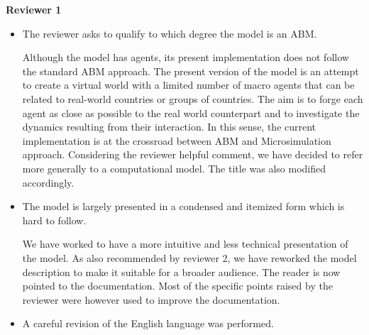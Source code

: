 \documentclass[a4paper,12pt]{article}
\begin{document}
\vskip1cm
\textbf{Reviewer 1}




\begin{itemize}
\item The reviewer asks to qualify to which degree the model is an ABM. 

Although the model has agents, its present implementation does not follow the standard ABM approach. 
The present version of the model is an attempt to create a virtual world with a limited number of macro agents that can be related to real-world countries or groups of countries. The aim is to forge each agent as close as possible to the real world counterpart and to investigate the dynamics resulting from their interaction. In this sense, the current implementation is at the crossroad between ABM and Microsimulation approach. 
Considering the reviewer helpful comment, we have decided to refer more generally to a computational model. The title was also modified accordingly.
\item The model is largely presented in a condensed and itemized form which is hard to follow.

    We have worked to have a more intuitive and less technical presentation of the model. As also recommended by reviewer 2, we have reworked the model description to make it suitable for a broader audience. The reader is now pointed to the documentation. Most of the specific points raised by the reviewer were however used to improve the documentation. 

\item A careful revision of the English language was performed.


\end{itemize}
\end{document}

